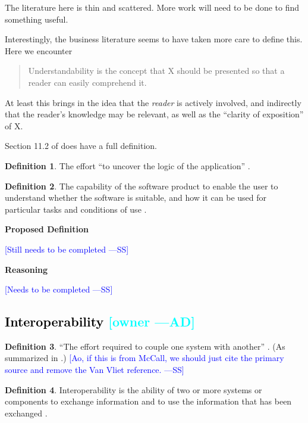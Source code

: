 \documentclass[letterpaper,cleveref]{lipics-v2019}
\newcommand{\authornote}[3]{\textcolor{#1}{[#3 ---#2]}}
\newcommand{\authornote}[3]{}
\newcommand{\wss}[1]{\authornote{blue}{SS}{#1}} %
\newcommand{\ad}[1]{\authornote{cyan}{AD}{#1}} %
\newcommand{\done}[1]{\textcolor{black}{#1}}
\theoremstyle{definition}
\newtheorem{defn}{Definition}
\begin{document}
The literature here is thin and scattered.  More work will need to be done to
find something useful.

Interestingly, the business literature seems to have taken more care to define
this.  Here we encounter
\begin{quote}
  Understandability is the concept that X should be presented so that a reader
  can easily comprehend it.
\end{quote}
At least this brings in the idea that the \emph{reader} is actively involved,
and indirectly that the reader's knowledge may be relevant, as well as the
``clarity of exposition'' of X.

Section 11.2 of \citet{adams2015nonfunctional} does have a full definition.

\begin{defn}
  The effort ``to uncover the logic of the application''
  \citep{ghezzi1991fundamentals}.
\end{defn}

\begin{defn}
  The capability of the software product to enable the user to understand
  whether the software is suitable, and how it can be used for particular tasks
  and conditions of use \cite{ISO9126}.
\end{defn}

\noindent \textbf{Proposed Definition}

\wss{Still needs to be completed}

\noindent \textbf{Reasoning}

\wss{Needs to be completed}

\subsection{\done{Interoperability} \ad{owner}}

\begin{defn}
  ``The effort required to couple one system with another''
  \citep{McCallEtAl1977}. (As summarized in \citet{VanVliet2000}.)  \wss{Ao, if
    this is from McCall, we should just cite the primary source and remove the
    Van Vliet reference.}
\end{defn}

\begin{defn}
  Interoperability is the ability of two or more systems or components to
  exchange information and to use the information that has been exchanged
  \citep{IEEEComputerDictionary1991}.
\end{defn}
\end{document}
